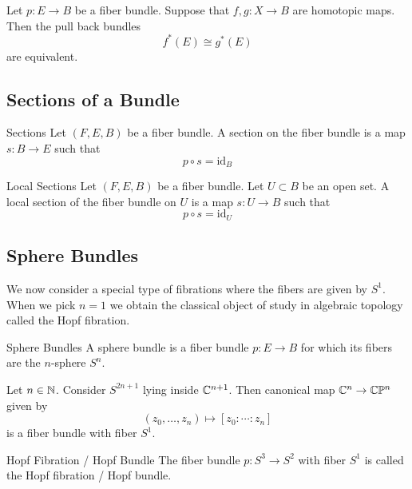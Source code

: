 \documentclass[a4paper]{article}
\begin{document}
\begin{thm}{}{} Let $p:E\to B$ be a fiber bundle. Suppose that $f,g:X\to B$ are homotopic maps. Then the pull back bundles $$f^\ast(E)\cong g^\ast(E)$$ are equivalent. 
\end{thm}

\subsection{Sections of a Bundle}
\begin{defn}{Sections}{} Let $(F,E,B)$ be a fiber bundle. A section on the fiber bundle is a map $s:B\to E$ such that $$p\circ s=\text{id}_B$$
\end{defn}

\begin{defn}{Local Sections}{} Let $(F,E,B)$ be a fiber bundle. Let $U\subset B$ be an open set. A local section of the fiber bundle on $U$ is a map $s:U\to B$ such that $$p\circ s=\text{id}_U$$
\end{defn}

\subsection{Sphere Bundles}
We now consider a special type of fibrations where the fibers are given by $S^1$. When we pick $n=1$ we obtain the classical object of study in algebraic topology called the Hopf fibration. 

\begin{defn}{Sphere Bundles}{} A sphere bundle is a fiber bundle $p:E\to B$ for which its fibers are the $n$-sphere $S^n$. 
\end{defn}

\begin{thm}{}{} Let $n\in\mathbb{N}$. Consider $S^{2n+1}$ lying inside $\mathbb{C}^{n+1}$. Then canonical map $\mathbb{C}^n\to\mathbb{C}\mathbb{P}^{n}$ given by $$(z_0,\dots,z_n)\mapsto[z_0:\cdots:z_n]$$ is a fiber bundle with fiber $S^1$. 
\end{thm}

\begin{defn}{Hopf Fibration / Hopf Bundle}{} The fiber bundle $p:S^3\to S^2$ with fiber $S^1$ is called the Hopf fibration / Hopf bundle. 
\end{defn}
\end{document}
